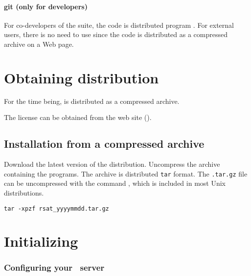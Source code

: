 \documentclass[12pt,a4paper, oneside]{scrreprt} %
\begin{document}
\subsubsection{git (only for developers)}

For co-developers of the \RSAT suite, the code is distributed program
. For external users, there is no need to use
 since the code is distributed as a compressed archive on
a Web page.


\chapter{Obtaining \RSAT distribution}

For the time being, \RSAT is distributed as a compressed archive. 

The license can be obtained from the \RSAT web site (\rsaturl).

\section{Installation from a compressed archive}

Download the latest version of the \RSAT distribution. Uncompress the
archive containing the programs. The archive is distributed
\texttt{tar} format. The \texttt{.tar.gz} file can be uncompressed
with the command , which is included in most Unix
distributions.

\begin{lstlisting}
tar -xpzf rsat_yyyymmdd.tar.gz
\end{lstlisting}



\chapter{Initializing \RSAT}

% 

\subsection{Configuring your \RSAT\ server}
\end{document}

